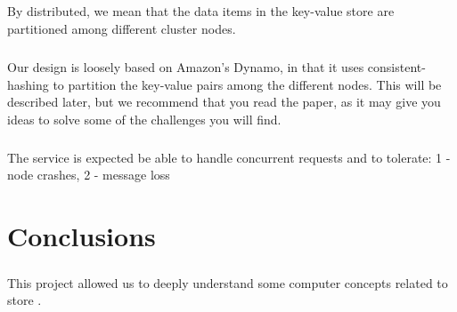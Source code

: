 \documentclass{report}
\begin{document}
			\paragraph{}By distributed, we mean that the data items in the key-value store are partitioned among different cluster nodes.
			
			\paragraph{} Our design is loosely based on Amazon's Dynamo, in that it uses consistent-hashing to partition the key-value pairs among the different nodes. This will be described later, but we recommend that you read the paper, as it may give you ideas to solve some of the challenges you will find.
			
			\paragraph{}The service is expected be able to handle concurrent requests and to tolerate:
			        1 - node crashes,
			        2 - message loss
			        
	
	\chapter{Conclusions}
	
	        \paragraph{}This project allowed us to deeply understand some computer concepts related to store .
	        
	        \paragraph{}
			
\end{document}
